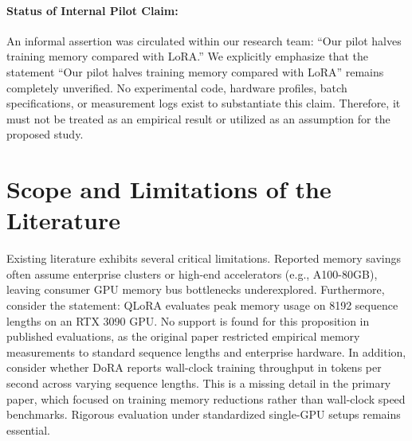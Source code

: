 \documentclass[11pt,a4paper]{article}
\begin{document}
\paragraph{Status of Internal Pilot Claim:}
An informal assertion was circulated within our research team: ``Our pilot halves training memory compared with LoRA.'' We explicitly emphasize that the statement ``Our pilot halves training memory compared with LoRA'' remains completely unverified. No experimental code, hardware profiles, batch specifications, or measurement logs exist to substantiate this claim. Therefore, it must not be treated as an empirical result or utilized as an assumption for the proposed study.

\section{Scope and Limitations of the Literature}
Existing literature exhibits several critical limitations. Reported memory savings often assume enterprise clusters or high-end accelerators (e.g., A100-80GB), leaving consumer GPU memory bus bottlenecks underexplored. Furthermore, consider the statement: QLoRA evaluates peak memory usage on 8192 sequence lengths on an RTX 3090 GPU. No support is found for this proposition in published evaluations, as the original paper restricted empirical memory measurements to standard sequence lengths and enterprise hardware. In addition, consider whether DoRA reports wall-clock training throughput in tokens per second across varying sequence lengths. This is a missing detail in the primary paper, which focused on training memory reductions rather than wall-clock speed benchmarks. Rigorous evaluation under standardized single-GPU setups remains essential.



\end{document}
